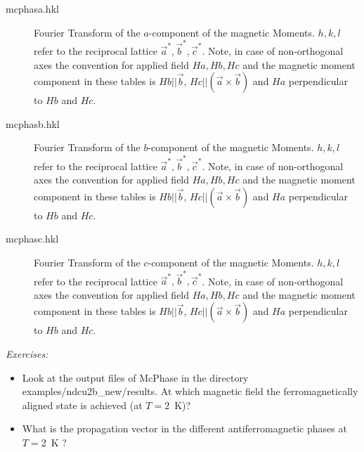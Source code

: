 \begin{description}
\item [\prg mcphasa.hkl]    Fourier Transform of the $a$-component of the magnetic Moments.
                           $h,k,l$ refer to the reciprocal lattice $\vec a^*,\vec b^*,\vec c^*$.
                            Note, in case of non-orthogonal axes the convention for applied field $Ha, Hb,Hc$ and
                            the magnetic moment component in these tables 
                            is $Hb||\vec b$, $Hc||(\vec a \times \vec b)$ and $Ha$ perpendicular to $Hb$ and $Hc$.
\item [\prg mcphasb.hkl]    Fourier Transform of the $b$-component of the magnetic Moments.
                           $h,k,l$ refer to the reciprocal lattice $\vec a^*,\vec b^*,\vec c^*$.
                            Note, in case of non-orthogonal axes the convention for applied field $Ha, Hb,Hc$ and
                            the magnetic moment component in these tables 
                            is $Hb||\vec b$, $Hc||(\vec a \times \vec b)$ and $Ha$ perpendicular to $Hb$ and $Hc$.
\item [\prg mcphasc.hkl]    Fourier Transform of the $c$-component of the magnetic Moments.
                           $h,k,l$ refer to the reciprocal lattice $\vec a^*,\vec b^*,\vec c^*$.
                            Note, in case of non-orthogonal axes the convention for applied field $Ha, Hb,Hc$ and
                            the magnetic moment component in these tables 
                            is $Hb||\vec b$, $Hc||(\vec a \times \vec b)$ and $Ha$ perpendicular to $Hb$ and $Hc$.
\end{description} 

\vspace{1cm}
{\em Exercises:}
\begin{itemize}
\item Look at the output files of {\prg McPhase}  in the directory
{\prg examples/ndcu2b\_new/results}.  At which magnetic field
the ferromagnetically aligned state is achieved (at $T=$2~K)?
\item
What is the propagation vector in the different antiferromagnetic phases at $T=$2~K ?
\end{itemize}

